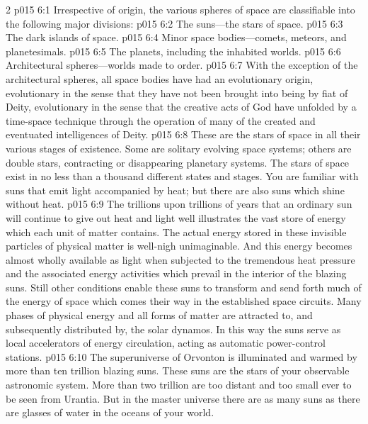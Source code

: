 \begin{multicols}{2}
\vs p015 6:1 Irrespective of origin, the various spheres of space are classifiable into the following major divisions:
\pc \vs p015 6:2 \bibnobreakspace The suns---the stars of space.
\vs p015 6:3 \bibnobreakspace The dark islands of space.
\vs p015 6:4 \bibnobreakspace Minor space bodies---comets, meteors, and planetesimals.
\vs p015 6:5 \bibnobreakspace The planets, including the inhabited worlds.
\vs p015 6:6 \bibnobreakspace Architectural spheres---worlds made to order.
\pc \vs p015 6:7 With the exception of the architectural spheres, all space bodies have had an evolutionary origin, evolutionary in the sense that they have not been brought into being by fiat of Deity, evolutionary in the sense that the creative acts of God have unfolded by a time\hyp{}space technique through the operation of many of the created and eventuated intelligences of Deity.
\pc \vs p015 6:8  These are the stars of space in all their various stages of existence. Some are solitary evolving space systems; others are double stars, contracting or disappearing planetary systems. The stars of space exist in no less than a thousand different states and stages. You are familiar with suns that emit light accompanied by heat; but there are also suns which shine without heat.
\vs p015 6:9 The trillions upon trillions of years that an ordinary sun will continue to give out heat and light well illustrates the vast store of energy which each unit of matter contains. The actual energy stored in these invisible particles of physical matter is well\hyp{}nigh unimaginable. And this energy becomes almost wholly available as light when subjected to the tremendous heat pressure and the associated energy activities which prevail in the interior of the blazing suns. Still other conditions enable these suns to transform and send forth much of the energy of space which comes their way in the established space circuits. Many phases of physical energy and all forms of matter are attracted to, and subsequently distributed by, the solar dynamos. In this way the suns serve as local accelerators of energy circulation, acting as automatic power\hyp{}control stations.
\vs p015 6:10 The superuniverse of Orvonton is illuminated and warmed by more than ten trillion blazing suns. These suns are the stars of your observable astronomic system. More than two trillion are too distant and too small ever to be seen from Urantia. But in the master universe there are as many suns as there are glasses of water in the oceans of your world.

\end{multicols}
